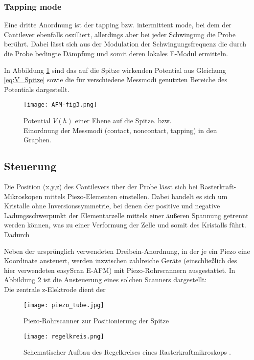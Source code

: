 \subsubsection{Tapping mode}
 Eine dritte Anordnung ist der tapping bzw. intermittent mode, bei dem der Cantilever ebenfalls oszilliert, allerdings aber bei jeder Schwingung die Probe berührt. Dabei lässt sich aus der Modulation der Schwingungsfrequenz die durch die Probe bedingte Dämpfung und somit deren lokales E-Modul ermitteln.


In Abbildung \ref{fig:Potential} sind das auf die Spitze wirkenden Potential aus Gleichung \eqref{eq:V_Spitze} sowie die für verschiedene Messmodi genutzten Bereiche des Potentials dargestellt.


\begin{figure}[h]
	\centering
	\texttt{[image: AFM-fig3.png]}
	\caption[Potential $V(h)$ einer Ebene auf die Spitze]
		     {Potential $V(h)$ einer Ebene auf die Spitze. \cite{lit:grenoble} bzw. \cite{lit:jpk}\\
			Einordnung der Messmodi (contact, noncontact, tapping) in den Graphen.}
	\label{fig:Potential}
\end{figure}

\subsection{Steuerung}
Die Position (x,y,z) des Cantilevers über der Probe lässt sich bei Rasterkraft-Mikroskopen mittels Piezo-Elementen einstellen. Dabei handelt es sich um Kristalle ohne Inversionssymmetrie, bei denen der positive und negative Ladungsschwerpunkt der Elementarzelle mittels einer äußeren Spannung getrennt werden können, was zu einer Verformung der Zelle und somit des Kristalls führt. Dadurch 

 Neben der ursprünglich verwendeten Dreibein-Anordnung, in der je ein Piezo eine Koordinate ansteuert, werden inzwischen  zahlreiche Geräte (einschließlich des hier verwendeten easyScan E-AFM) mit Piezo-Rohrscannern ausgestattet. In Abbildung \ref{fig:tube} ist die Ansteuerung eines solchen Scanners dargestellt:\\
Die zentrale z-Elektrode dient der 


\begin{figure}[p]
	\centering
	\texttt{[image: piezo\_tube.jpg]}
	\caption{Piezo-Rohrscanner zur Positionierung der Spitze \cite{lit:tube}}
	\label{fig:tube}
\end{figure}




\begin{figure}[p]
	\centering
	\texttt{[image: regelkreis.png]}
	\caption{Schematischer Aufbau des Regelkreises eines Rasterkraftmikroskops \cite{lit:guide}.}
	\label{fig:feedback}
\end{figure}

\subsection{}